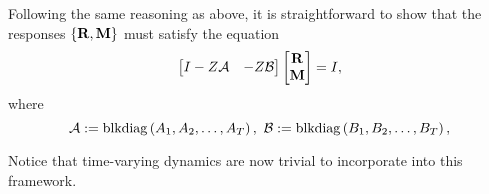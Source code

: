 \documentclass[11pt]{article}
\numberwithin{equation}{section}
\begin{document}
Following the same reasoning as above, it is straightforward to show that the responses $\{\mathbf{R}, \mathbf{M}\}$ must satisfy the equation
\begin{equation}
\begin{bmatrix} I - Z\mathcal{A} & -Z\mathcal{B} \end{bmatrix}\begin{bmatrix} \mathbf{R} \\ \mathbf{M} \end{bmatrix} = I,
\label{eq:subspace}
\end{equation}
where
\begin{equation}
\mathcal{A} := \mathrm{blkdiag}\left(A_1,A_2,\dots,A_T\right), \ \mathcal{B} := \mathrm{blkdiag}\left(B_1,B_2,\dots,B_T\right),
\end{equation}

\begin{remark}
Notice that time-varying dynamics are now trivial to incorporate into this framework.
\end{remark}
\end{document}
